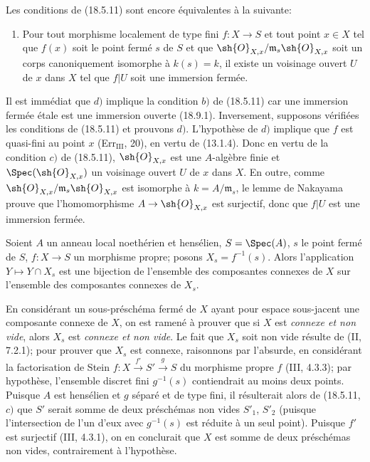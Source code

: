 \begin{remark}[18.5.18]
\label{IV.18.5.18}
Les conditions de (18.5.11) sont encore équivalentes à la suivante:
\begin{enumerate}
  \item[d)] Pour tout morphisme localement de type fini $f:X\to S$ et tout point $x\in X$ tel que $f(x)$ soit le point fermé $s$ de $S$ et que $\sh{O}_{X,x}/\mathfrak m_s\sh{O}_{X,x}$ soit un corps canoniquement isomorphe à $k(s)=k$, il existe un voisinage ouvert $U$ de $x$ dans $X$ tel que $f|U$ soit une immersion fermée.
\end{enumerate}
\end{remark}


Il est immédiat que $d)$ implique la condition $b)$ de (18.5.11) car une immersion fermée étale est une immersion ouverte (18.9.1). Inversement, supposons vérifiées les conditions de (18.5.11) et prouvons $d)$. L'hypothèse de $d)$ implique que $f$ est quasi-fini au point $x$ (Err$_{\mathrm{III}}$, 20), en vertu de (13.1.4). Donc en vertu de la condition $c)$ de (18.5.11), $\sh{O}_{X,x}$ est une $A$-algèbre finie et $\Spec(\sh{O}_{X,x})$ un voisinage ouvert $U$ de $x$ dans $X$. En outre, comme $\sh{O}_{X,x}/\mathfrak m_s\sh{O}_{X,x}$ est isomorphe à $k=A/\mathfrak m_s$, le lemme de Nakayama prouve que l'homomorphisme $A\to\sh{O}_{X,x}$ est surjectif, donc que $f|U$ est une immersion fermée.

\begin{proposition}[18.5.19]
\label{IV.18.5.19}
Soient $A$ un anneau local noethérien et hensélien, $S=\Spec(A)$, $s$ le point fermé de $S$, $f:X\to S$ un morphisme propre; posons $X_s=f^{-1}(s)$. Alors l'application $Y\longmapsto Y\cap X_s$ est une bijection de l'ensemble des composantes connexes de $X$ sur l'ensemble des composantes connexes de $X_s$.
\end{proposition}

En considérant un sous-préschéma fermé de $X$ ayant pour espace sous-jacent une composante connexe de $X$, on est ramené à prouver que si $X$ est \emph{connexe et non vide}, alors $X_s$ est \emph{connexe et non vide}. Le fait que $X_s$ soit non vide résulte de (II, 7.2.1); pour prouver que $X_s$ est connexe, raisonnons par l'absurde, en considérant la factorisation de Stein $f:X\xrightarrow{f'}S'\xrightarrow{g}S$ du morphisme propre $f$ (III, 4.3.3); par hypothèse, l'ensemble discret fini $g^{-1}(s)$ contiendrait au moins deux points. Puisque $A$ est hensélien et $g$ séparé et de type fini, il résulterait alors de (18.5.11, $c)$ que $S'$ serait somme de deux préschémas non vides $S'_1$, $S'_2$ (puisque l'intersection de l'un d'eux avec $g^{-1}(s)$ est réduite à un seul point). Puisque $f'$ est surjectif (III, 4.3.1), on en conclurait que $X$ est somme de deux préschémas non vides, contrairement à l'hypothèse.

